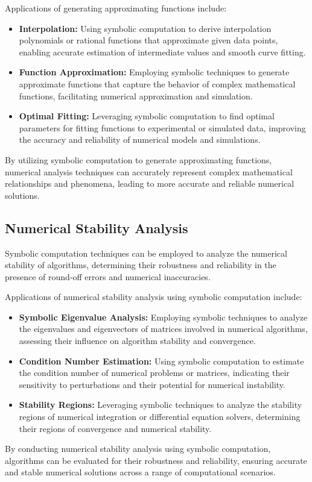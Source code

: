 Applications of generating approximating functions include:
%
\begin{itemize}
  \item \textbf{Interpolation:} Using symbolic computation to derive interpolation polynomials or rational functions that approximate given data points, enabling accurate estimation of intermediate values and smooth curve fitting.
  \item \textbf{Function Approximation:} Employing symbolic techniques to generate approximate functions that capture the behavior of complex mathematical functions, facilitating numerical approximation and simulation.
  \item \textbf{Optimal Fitting:} Leveraging symbolic computation to find optimal parameters for fitting functions to experimental or simulated data, improving the accuracy and reliability of numerical models and simulations.
\end{itemize}
%
By utilizing symbolic computation to generate approximating functions, numerical analysis techniques can accurately represent complex mathematical relationships and phenomena, leading to more accurate and reliable numerical solutions.

\subsection{Numerical Stability Analysis}

Symbolic computation techniques can be employed to analyze the numerical stability of algorithms, determining their robustness and reliability in the presence of round-off errors and numerical inaccuracies.

Applications of numerical stability analysis using symbolic computation include:
%
\begin{itemize}
  \item \textbf{Symbolic Eigenvalue Analysis:} Employing symbolic techniques to analyze the eigenvalues and eigenvectors of matrices involved in numerical algorithms, assessing their influence on algorithm stability and convergence.
  \item \textbf{Condition Number Estimation:} Using symbolic computation to estimate the condition number of numerical problems or matrices, indicating their sensitivity to perturbations and their potential for numerical instability.
  \item \textbf{Stability Regions:} Leveraging symbolic techniques to analyze the stability regions of numerical integration or differential equation solvers, determining their regions of convergence and numerical stability.
\end{itemize}
%
By conducting numerical stability analysis using symbolic computation, algorithms can be evaluated for their robustness and reliability, ensuring accurate and stable numerical solutions across a range of computational scenarios.

